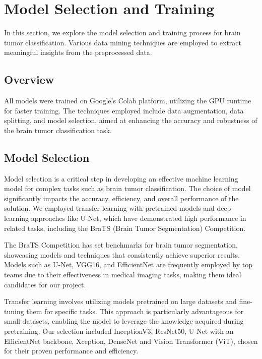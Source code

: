\section{Model Selection and Training}\label{model_training}

In this section, we explore the model selection and training process for brain tumor classification. Various data mining techniques are employed to extract meaningful insights from the preprocessed data.

\subsection{Overview}\label{overview}

All models were trained on Google's Colab platform, utilizing the GPU runtime for faster training. The techniques employed include data augmentation, data splitting, and model selection, aimed at enhancing the accuracy and robustness of the brain tumor classification task.

\subsection{Model Selection}\label{model_selection}

Model selection is a critical step in developing an effective machine learning model for complex tasks such as brain tumor classification. The choice of model significantly impacts the accuracy, efficiency, and overall performance of the solution. We employed transfer learning with pretrained models and deep learning approaches like U-Net, which have demonstrated high performance in related tasks, including the BraTS (Brain Tumor Segmentation) Competition.

The BraTS Competition has set benchmarks for brain tumor segmentation, showcasing models and techniques that consistently achieve superior results. Models such as U-Net, VGG16, and EfficientNet are frequently employed by top teams due to their effectiveness in medical imaging tasks, making them ideal candidates for our project.

Transfer learning involves utilizing models pretrained on large datasets and fine-tuning them for specific tasks. This approach is particularly advantageous for small datasets, enabling the model to leverage the knowledge acquired during pretraining. Our selection included InceptionV3, ResNet50, U-Net with an EfficientNet backbone, Xception, DenseNet and Vision Transformer (ViT), chosen for their proven performance and efficiency.


